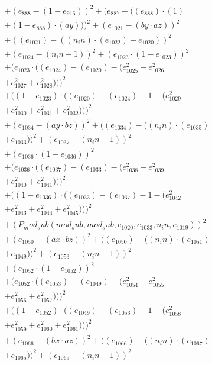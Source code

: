 \documentclass[10pt, a4paper]{article}
\begin{document}
\begin{align*}
& + (e_{888} - (1 - e_{916}))^{2} + (e_{887} - ((e_{888})  \cdot  (1) \\
& + (1 - e_{888})  \cdot  (ay)))^{2} + (e_{1021} - (by  \cdot  az))^{2} \\
& + ((e_{1021}) - ((n_in)  \cdot  (e_{1022}) + e_{1020}))^{2} \\
& + (e_{1024} - (n_in - 1))^{2} + (e_{1023}  \cdot  (1 - e_{1023}))^{2} \\
& + (e_{1023}  \cdot  ((e_{1024}) - (e_{1020}) - (e_{1025}^{2} + e_{1026}^{2} \\
& + e_{1027}^{2} + e_{1028}^{2})))^{2} \\
& + ((1 - e_{1023})  \cdot  ((e_{1020}) - (e_{1024}) - 1 - (e_{1029}^{2} \\
& + e_{1030}^{2} + e_{1031}^{2} + e_{1032}^{2})))^{2} \\
& + (e_{1034} - (ay  \cdot  bz))^{2} + ((e_{1034}) - ((n_in)  \cdot  (e_{1035}) \\
& + e_{1033}))^{2} + (e_{1037} - (n_in - 1))^{2} \\
& + (e_{1036}  \cdot  (1 - e_{1036}))^{2} \\
& + (e_{1036}  \cdot  ((e_{1037}) - (e_{1033}) - (e_{1038}^{2} + e_{1039}^{2} \\
& + e_{1040}^{2} + e_{1041}^{2})))^{2} \\
& + ((1 - e_{1036})  \cdot  ((e_{1033}) - (e_{1037}) - 1 - (e_{1042}^{2} \\
& + e_{1043}^{2} + e_{1044}^{2} + e_{1045}^{2})))^{2} \\
& + (P_mod_sub(mod_sub, mod_sub, e_{1020}, e_{1033}, n_in, e_{1019}))^{2} \\
& + (e_{1050} - (ax  \cdot  bz))^{2} + ((e_{1050}) - ((n_in)  \cdot  (e_{1051}) \\
& + e_{1049}))^{2} + (e_{1053} - (n_in - 1))^{2} \\
& + (e_{1052}  \cdot  (1 - e_{1052}))^{2} \\
& + (e_{1052}  \cdot  ((e_{1053}) - (e_{1049}) - (e_{1054}^{2} + e_{1055}^{2} \\
& + e_{1056}^{2} + e_{1057}^{2})))^{2} \\
& + ((1 - e_{1052})  \cdot  ((e_{1049}) - (e_{1053}) - 1 - (e_{1058}^{2} \\
& + e_{1059}^{2} + e_{1060}^{2} + e_{1061}^{2})))^{2} \\
& + (e_{1066} - (bx  \cdot  az))^{2} + ((e_{1066}) - ((n_in)  \cdot  (e_{1067}) \\
& + e_{1065}))^{2} + (e_{1069} - (n_in - 1))^{2} \\

\end{align*}
\end{document}

